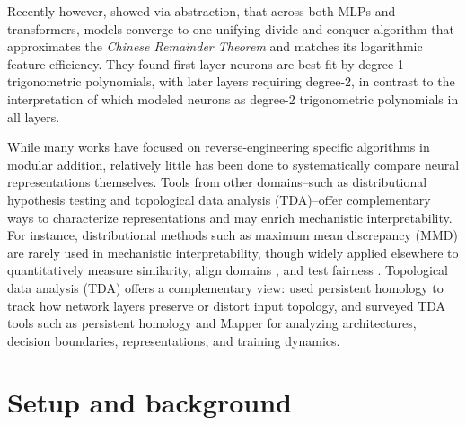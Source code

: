 \documentclass{article} %
\theoremstyle{plain}
\theoremstyle{definition}
\newtheorem{empirical fact}[theorem]{Empirical Fact}
\begin{document}
Recently however, \cite{mccracken2025uncoveringuniversalabstractalgorithm} showed via abstraction, that across both MLPs and transformers, models converge to one unifying divide-and-conquer algorithm that approximates the \textit{Chinese Remainder Theorem} and matches its logarithmic feature efficiency. They found first-layer neurons are best fit by degree-1 trigonometric polynomials, with later layers requiring degree-2, in contrast to the interpretation of \cite{nanda2023progress} which modeled neurons as degree-2 trigonometric polynomials in all layers.


While many works have focused on reverse-engineering specific algorithms in modular addition, relatively little has been done to systematically compare neural representations themselves. Tools from other domains--such as distributional hypothesis testing and topological data analysis (TDA)--offer complementary ways to characterize representations and may enrich mechanistic interpretability.
For instance, distributional methods such as maximum mean discrepancy (MMD) \cite{gretton2012kernel} are rarely used in mechanistic interpretability, though widely applied elsewhere to quantitatively measure similarity, align domains \cite{ghifary2014domain, zhao2019learning}, and test fairness \cite{deka2023mmd, kong2025fair}. Topological data analysis (TDA) offers a complementary view: \cite{shahidullah2022topologicaldataanalysisneural} used persistent homology to track how network layers preserve or distort input topology, and \cite{ballester2024topologicaldataanalysisneural} surveyed TDA tools such as persistent homology and Mapper for analyzing architectures, decision boundaries, representations, and training dynamics.




\section{Setup and background}
\end{document}
